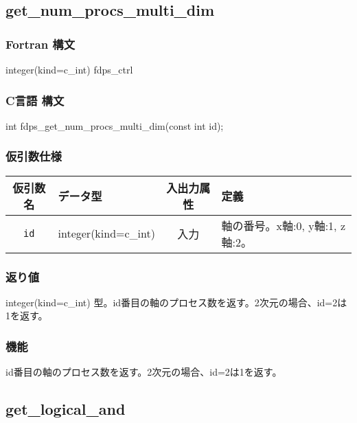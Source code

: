 \subsection{get\_num\_procs\_multi\_dim}
\subsubsection*{Fortran 構文}
\begin{screen}
\begin{spverbatim}
integer(kind=c_int) fdps_ctrl%
\end{spverbatim}
\end{screen}

\subsubsection*{C言語 構文}
\begin{screen}
\begin{spverbatim}
int fdps_get_num_procs_multi_dim(const int id);
\end{spverbatim}
\end{screen}

\subsubsection*{仮引数仕様}
\begin{table}[h]
\begin{tabularx}{\linewidth}{cXcX}
\toprule
\rowcolor{Snow2}
仮引数名 & データ型 & 入出力属性 & 定義 \\
\midrule
\verb|id| & integer(kind=c\_int) & 入力 & 軸の番号。x軸:0, y軸:1, z軸:2。\\
\bottomrule
\end{tabularx}
\end{table}

\subsubsection*{返り値}
integer(kind=c\_int) 型。id番目の軸のプロセス数を返す。2次元の場合、id=2は1を返す。

\subsubsection*{機能}
id番目の軸のプロセス数を返す。2次元の場合、id=2は1を返す。
\clearpage

\subsection{get\_logical\_and}
